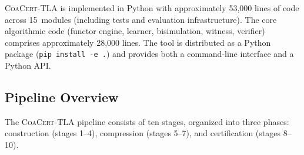 \documentclass[11pt]{article}
\newcommand{\CoaCert}{\textsc{CoaCert-TLA}}
\begin{document}
\CoaCert{} is implemented in Python with approximately 53{,}000 lines of
code across 15~modules (including tests and evaluation infrastructure).
The core algorithmic code (functor engine, learner, bisimulation, witness,
verifier) comprises approximately 28{,}000 lines.
The tool is distributed as a Python package (\texttt{pip install -e .}) and
provides both a command-line interface and a Python API.

\subsection{Pipeline Overview}

The \CoaCert{} pipeline consists of ten stages, organized into three
phases: construction (stages 1--4), compression (stages 5--7), and
certification (stages 8--10).
\end{document}
